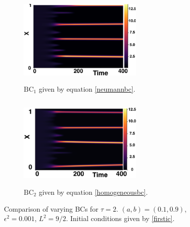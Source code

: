 \begin{figure}[H]
    \centering
    \begin{subfigure}[t]{0.45\textwidth}
        \centering
        \includegraphics[width=6cm,height=4.5cm]{ic22.png}
        \caption{$\text{BC}_1$ given by equation \eqref{neumannbc}.}
        \label{}
    \end{subfigure}
    \hfill
    \begin{subfigure}[t]{0.45\textwidth}
        \centering
        \includegraphics[width=6cm,height=4.5cm]{bc2.png}
        \caption{$\text{BC}_2$ given by equation \eqref{homogeneousbc}.}
        \label{}
    \end{subfigure}
    \caption{Comparison of varying BCs for $\tau=2$. $(a,b)=(0.1,0.9)$, $\epsilon^2=0.001$, $L^2=9/2$. Initial conditions given by \eqref{firstic}.}
    \label{fig:Bbc2}
\end{figure}

